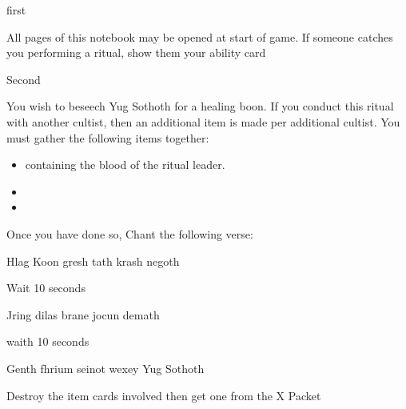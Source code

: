 \documentclass[greennotebook]{guildcamp4} %
\begin{document}
\startnotebook{\nRasputinYog{}}

\begin{page}{first}
	
	All pages of this notebook may be opened at start of game.  If someone catches you performing a ritual, show them your ability card \aRitual{}
	
\end{page}

\begin{page}{Second}
		
		You wish to beseech Yug Sothoth for a healing boon. If you conduct this ritual with another cultist, then an additional item is made per additional cultist. You must gather the following items together: 
		
		\begin{itemize}
			\item \iTestTube{} containing the blood of the ritual leader.
			\item \iSieve{}
			\item \iCauldron{}
		\end{itemize}
	
		Once you have done so, Chant the following verse:
		
		Hlag Koon gresh tath krash negoth
		
		Wait 10 seconds
		
		Jring dilas brane jocun demath
		
		waith 10 seconds
		
		Genth fhrium seinot wexey Yug Sothoth
		
		Destroy the item cards involved then get one \iHealthPotion{} from the X Packet 

	\end{page}
	
\end{document}
